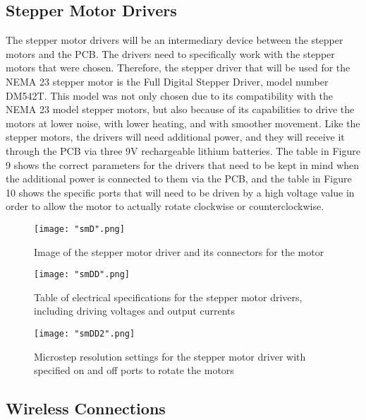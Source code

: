 \subsection{Stepper Motor Drivers} 
The stepper motor drivers will be an intermediary device between the stepper motors and the PCB. The drivers need to specifically work with the stepper motors that were chosen. Therefore, the stepper driver that will be used for the NEMA 23 stepper motor is the Full Digital Stepper Driver, model number DM542T. This model was not only chosen due to its compatibility with the NEMA 23 model stepper motors, but also because of its capabilities to drive the motors at lower noise, with lower heating, and with smoother movement. Like the stepper motors, the drivers will need additional power, and they will receive it through the PCB via three 9V rechargeable lithium batteries.
The table in Figure 9 shows the correct parameters for the drivers that need to be kept in mind when the additional power is connected to them via the PCB, and the table in Figure 10 shows the specific ports that will need to be driven by a high voltage value in order to allow the motor to actually rotate clockwise or counterclockwise.

\begin{figure}[H]
	\centering
	{\texttt{[image: "smD".png]}}
	\caption{Image of the stepper motor driver and its connectors for the motor\cite{smdataR}}
	\label{fig:smD}
\end{figure}

\begin{figure}[H]
	\centering
	{\texttt{[image: "smDD".png]}}
	\caption{Table of electrical specifications for the stepper motor drivers, including driving voltages and output currents
		\cite{smdataD}}
	\label{fig:smDD}
\end{figure}

\begin{figure}[H]
	\centering
	{\texttt{[image: "smDD2".png]}}
	\caption{ Microstep resolution settings for the stepper motor driver with specified on and off ports to rotate the motors
		\cite{smdataDD}}
	\label{fig:smDD2}
\end{figure}

\subsection{Wireless Connections}

